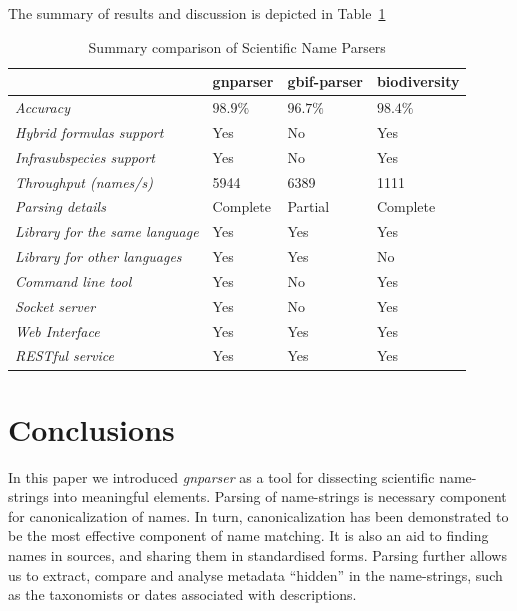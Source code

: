 \documentclass{bmcart}
\begin{document}
The summary of results and discussion is depicted in
Table~\ref{table:summary}

\begin{table}[htb]
  \begin{center}
    \caption{Summary comparison of Scientific Name Parsers}
    \label{table:summary}
    \resizebox{12.5cm}{!} {
    \begin{tabular}{|l|*{3}{l}|}
      \hline
                             & gnparser & gbif-parser & biodiversity \\
      \hline
      \textit{Accuracy}                     & $98.9\%$ & $96.7\%$ & $98.4\%$\\
      \textit{Hybrid formulas support}      & Yes      & No       & Yes     \\
      \textit{Infrasubspecies support}      & Yes      & No       & Yes     \\
      \textit{Throughput (names/s)}         & 5944     & 6389     & 1111    \\
      \textit{Parsing details}              & Complete & Partial  & Complete\\
      \textit{Library for the same language}& Yes      & Yes      & Yes     \\
      \textit{Library for other languages}  & Yes      & Yes      & No      \\
      \textit{Command line tool}            & Yes      & No       & Yes     \\
      \textit{Socket server}                & Yes      & No       & Yes     \\
      \textit{Web Interface}                & Yes      & Yes      & Yes     \\
      \textit{RESTful service}              & Yes      & Yes      & Yes     \\
      \hline
    \end{tabular}
  }
  \end{center}
\end{table}

\section*{Conclusions}

In this paper we introduced \textit{gnparser} as a tool for dissecting
scientific name-strings into meaningful elements. Parsing of name-strings is
necessary component for canonicalization of names. In turn, canonicalization
has been demonstrated to be the most effective component of name matching. It
is also an aid to finding names in sources, and sharing them in standardised
forms. Parsing further allows us to extract, compare and analyse metadata
``hidden'' in the name-strings, such as the taxonomists or dates associated
with descriptions.
\end{document}
